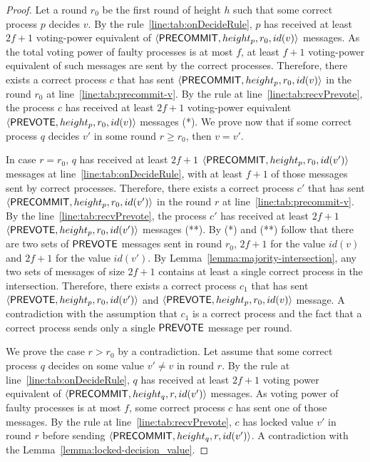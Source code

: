 \begin{proof}
Let a round $r_0$ be the first round of height $h$ such that some correct process $p$ decides $v$. By the rule~\ref{line:tab:onDecideRule}, $p$ has received at least $2f+1$ voting-power equivalent of $\langle\mathsf{PRECOMMIT},height_p,r_0,id(v)\rangle$ messages.  
As the total voting power of faulty processes is at most $f$, at least $f+1$ voting-power equivalent of such messages are sent by the correct processes. Therefore, there exists a correct process $c$ that has sent $\langle\mathsf{PRECOMMIT},height_p,r_0,id(v)\rangle$ in the round $r_0$ at line~\ref{line:tab:precommit-v}. By the rule at line~\ref{line:tab:recvPrevote}, the process $c$ has received at least $2f+1$ voting-power equivalent $\langle\mathsf{PREVOTE},height_p, r_0,id(v)\rangle$ messages (*).  
We prove now that if some correct process $q$ decides $v'$ in some round $r \ge r_0$, then $v = v'$.

In case $r = r_0$, $q$ has received at least $2f+1$ $\langle\mathsf{PRECOMMIT},height_p,r_0,id(v')\rangle$  messages at line~\ref{line:tab:onDecideRule}, with at least $f+1$ of those messages sent by correct processes. Therefore, there exists a correct process $c'$ that has sent $\langle\mathsf{PRECOMMIT},height_p,r_0,id(v')\rangle$ in the round $r$ at line~\ref{line:tab:precommit-v}. By the line~\ref{line:tab:recvPrevote}, the process $c'$ has received at least $2f+1$ $\langle\mathsf{PREVOTE},height_p, r_0,id(v')\rangle$ messages (**). By (*) and (**) follow that there are two sets of $\mathsf{PREVOTE}$ messages sent in round $r_0$, $2f+1$ for the value $id(v)$ and $2f+1$ for the value $id(v')$. By Lemma~\ref{lemma:majority-intersection}, any two sets of messages of size $2f+1$ contains at least a single correct process in the intersection. Therefore, there exists a correct process $c_1$ that has sent $\langle\mathsf{PREVOTE},height_p, r_0,id(v')\rangle$ and $\langle\mathsf{PREVOTE},height_p, r_0,id(v)\rangle$ message. A contradiction with the assumption that $c_1$ is a correct process and the fact that a correct process sends only a single $\mathsf{PREVOTE}$ message per round.

We prove the case $r > r_0$ by a contradiction. Let assume that some correct process $q$ decides on some value $v' \neq v$ in round $r$. By the rule at line~\ref{line:tab:onDecideRule}, $q$ has received at least $2f+1$ voting power equivalent of $\langle\mathsf{PRECOMMIT},height_q, r,id(v')\rangle$ messages. As voting power of faulty processes is at most $f$, some correct process $c$ has sent one of those messages. By the rule at line~\ref{line:tab:recvPrevote}, $c$ has locked value $v'$ in round $r$ before sending $\langle\mathsf{PRECOMMIT},height_q, r,id(v')\rangle$. A contradiction with the 
Lemma~\ref{lemma:locked-decision_value}. 
\end{proof}	

